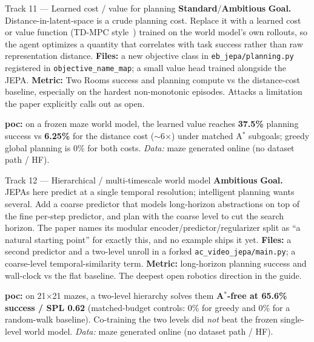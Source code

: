 \documentclass{article}
\newcommand{\code}[1]{\texttt{\small #1}}
\newcommand{\file}[1]{\texttt{\small #1}}
\newcommand{\diffmed}{\colorbox{ebamber!18}{\textcolor{ebamber}{\small\bfseries Standard}}}
\newcommand{\diffhard}{\colorbox{ebred!15}{\textcolor{ebred}{\small\bfseries Ambitious}}}
\begin{document}
\begin{trackbox}{Track 11 --- Learned cost / value for planning \hfill \diffmed{}/\diffhard{}}
\textbf{Goal.} Distance-in-latent-space is a crude planning cost. Replace it with a
learned cost or value function (TD-MPC style~\citep{TDMPC2,TD-MPC}) trained on the
world model's own rollouts, so the agent optimizes a quantity that correlates with
task success rather than raw representation distance. \textbf{Files:} a new
objective class in \file{eb\_jepa/planning.py} registered in
\code{objective\_name\_map}; a small value head trained alongside the JEPA.
\textbf{Metric:} Two Rooms success and planning compute vs the distance-cost
baseline, especially on the hardest non-monotonic episodes. Attacks a limitation
the paper explicitly calls out as open.

\smallskip
\textbf{poc:} on a frozen maze world model, the learned value reaches \textbf{37.5\%}
planning success vs \textbf{6.25\%} for the distance cost ($\sim$6$\times$) under
matched A$^*$ subgoals; greedy global planning is 0\% for both costs.
\emph{Data:} maze generated online (no dataset path / HF).
\end{trackbox}

\begin{trackbox}{Track 12 --- Hierarchical / multi-timescale world model \hfill \diffhard{}}
\textbf{Goal.} JEPAs here predict at a single temporal resolution; intelligent
planning wants several. Add a coarse predictor that models long-horizon
abstractions on top of the fine per-step predictor, and plan with the coarse level
to cut the search horizon. The paper names its modular encoder/predictor/regularizer
split as ``a natural starting point'' for exactly this, and no example ships it yet.
\textbf{Files:} a second predictor and a two-level unroll in a forked
\code{ac\_video\_jepa/main.py}; a coarse-level temporal-similarity term.
\textbf{Metric:} long-horizon planning success and wall-clock vs the flat baseline.
The deepest open robotics direction in the guide.

\smallskip
\textbf{poc:} on 21$\times$21 mazes, a two-level hierarchy solves them
\textbf{A$^*$-free at 65.6\% success / SPL 0.62} (matched-budget controls: 0\% for
greedy and 0\% for a random-walk baseline). Co-training the two levels did
\emph{not} beat the frozen single-level world model.
\emph{Data:} maze generated online (no dataset path / HF).
\end{trackbox}
\end{document}
